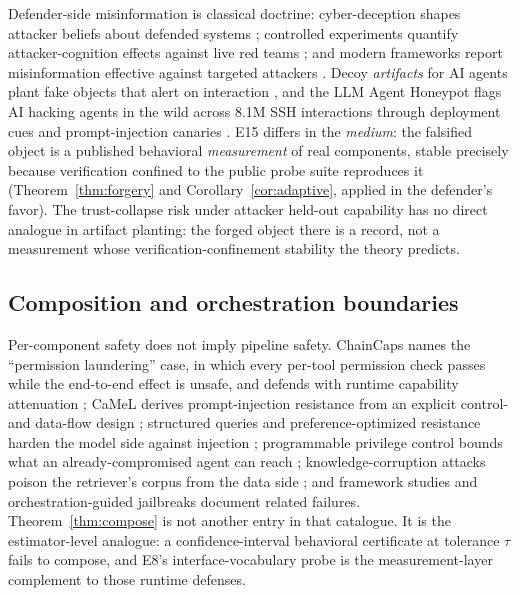 Defender-side misinformation is classical doctrine: cyber-deception shapes
attacker beliefs about defended systems \cite{bodeau2013}; controlled
experiments quantify attacker-cognition effects against live red teams
\cite{tularosa2019,fergusonwalter2017}; and modern frameworks report
misinformation effective against targeted attackers \cite{perry2025}.
Decoy \emph{artifacts} for AI agents plant fake objects that alert on
interaction \cite{honeypotagents2026}, and the LLM Agent Honeypot flags AI
hacking agents in the wild across 8.1M SSH interactions through deployment
cues
and prompt-injection canaries \cite{volkov2024}. E15 differs in the
\emph{medium}: the falsified object is a published behavioral
\emph{measurement} of real components, stable precisely because verification
confined to the public probe suite reproduces it (Theorem~\ref{thm:forgery}
and Corollary~\ref{cor:adaptive}, applied in the defender's favor). The trust-collapse
risk under attacker held-out capability has no direct analogue in artifact
planting: the forged object there is a record, not a measurement whose
verification-confinement stability the theory predicts.

\subsection{Composition and orchestration boundaries}

Per-component safety does not imply pipeline safety. ChainCaps names the
``permission laundering'' case, in which every per-tool permission check
passes while the end-to-end effect is unsafe, and defends with runtime
capability attenuation \cite{chaincaps2026}; CaMeL derives prompt-injection
resistance from an explicit control- and data-flow design \cite{camel2026};
structured queries and preference-optimized resistance harden the model
side against injection \cite{struq2025,secalign2025}; programmable privilege
control bounds what an already-compromised agent can reach
\cite{progent2025}; knowledge-corruption attacks poison the retriever's
corpus from the data side \cite{poisonedrag2025}; and framework studies
\cite{orchestration2026} and orchestration-guided jailbreaks
\cite{orchjail2026} document related failures. Theorem~\ref{thm:compose} is
not another entry in that catalogue. It is the estimator-level analogue: a
confidence-interval behavioral certificate at tolerance $\tau$ fails to
compose, and E8's interface-vocabulary probe is the measurement-layer
complement to those runtime defenses.

